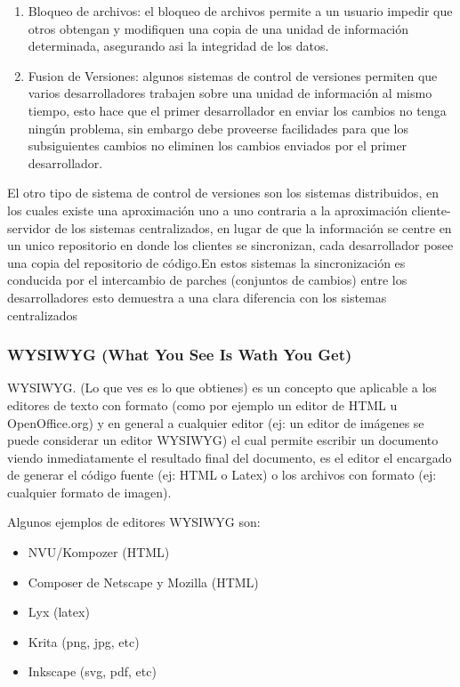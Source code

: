 \begin{enumerate}

	\item Bloqueo de archivos: el bloqueo de archivos permite a un usuario impedir que otros obtengan y modifiquen una copia de una unidad de información determinada, asegurando asi la integridad de los datos.
	
	\item Fusion de Versiones: algunos sistemas de control de versiones permiten que varios desarrolladores trabajen sobre una unidad de información al mismo tiempo, esto hace que el primer desarrollador en enviar los cambios no tenga ningún problema, sin embargo debe proveerse facilidades para que los subsiguientes cambios no eliminen los cambios enviados por el primer desarrollador.

\end{enumerate}

El otro tipo de sistema de control de versiones son los sistemas distribuidos, en los cuales existe una aproximación uno a uno contraria a la aproximación cliente-servidor de los sistemas centralizados, en lugar de que la información se centre en un unico repositorio en donde los clientes se sincronizan, cada desarrollador posee una copia del repositorio de código.\newline En estos sistemas la sincronización es conducida por el intercambio de parches (conjuntos de cambios) entre los desarrolladores esto demuestra a una clara diferencia con los sistemas centralizados

\subsubsection*{WYSIWYG (What You See Is Wath You Get)}

WYSIWYG. (Lo que ves es lo que obtienes) es un concepto que aplicable a los editores de texto con formato (como por ejemplo un editor de HTML u OpenOffice.org) y en general a cualquier editor (ej: un editor de imágenes se puede considerar un editor WYSIWYG) el cual permite escribir un documento viendo inmediatamente el resultado final del documento, es el editor el encargado de generar el código fuente (ej: HTML o Latex) o los archivos con formato (ej: cualquier formato de imagen).

Algunos ejemplos de editores WYSIWYG son:

\begin{itemize}

	\item NVU/Kompozer (HTML)
	\item Composer de Netscape y Mozilla (HTML)
	\item Lyx (latex)
	\item Krita (png, jpg, etc)
	\item Inkscape (svg, pdf, etc)

\end{itemize}


